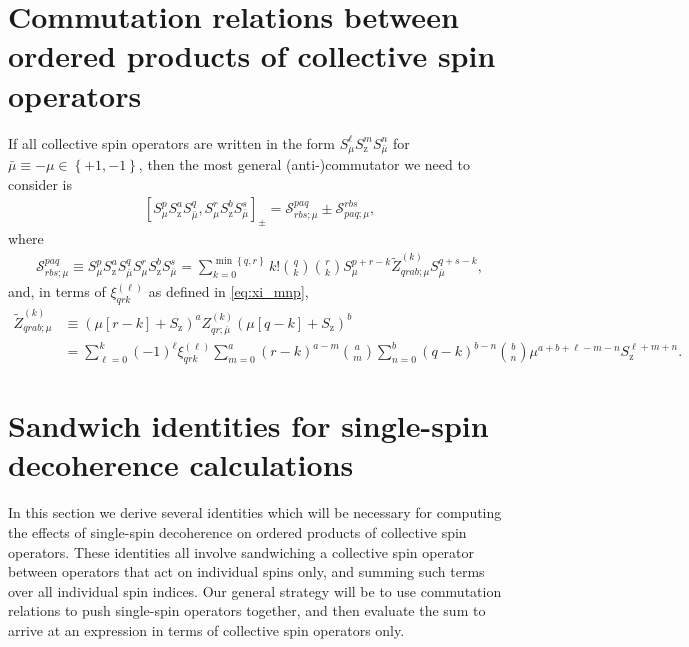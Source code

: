 \documentclass[aps,notitlepage,nofootinbib,11pt]{revtex4-1}
\newcommand{\p}[1]{\left(#1\right)} %
\renewcommand{\sp}[1]{\left[#1\right]} %
\renewcommand{\set}[1]{\left\{#1\right\}} %
\renewcommand{\S}{\mathcal{S}}
\newcommand{\z}{\text{z}}
\newcommand{\bmu}{{\bar\mu}}
\newcommand{\1}{\mathds{1}}
\begin{document}
\section{Commutation relations between ordered products of collective
  spin operators}
\label{sec:comm_general}

If all collective spin operators are written in the form
$S_\mu^\ell S_\z^m S_\bmu^n$ for $\bmu\equiv-\mu\in\set{+1,-1}$, then
the most general (anti-)commutator we need to consider is
\begin{align}
  \sp{S_\mu^p S_\z^a S_\bmu^q, S_\mu^r S_\z^b S_\bmu^s}_\pm
  = \S^{paq}_{rbs;\mu} \pm \S^{rbs}_{paq;\mu},
\end{align}
where
\begin{align}
  \S^{paq}_{rbs;\mu}
  \equiv S_\mu^p S_\z^a S_\bmu^q S_\mu^r S_\z^b S_\bmu^s
  = \sum_{k=0}^{\min\set{q,r}} k! { q \choose k } { r \choose k }
  S_\mu^{p+r-k} \tilde Z_{qrab;\mu}^{(k)} S_\bmu^{q+s-k},
\end{align}
and, in terms of $\xi_{qrk}^{(\ell)}$ as defined in \eqref{eq:xi_mnp},
\begin{align}
  \tilde Z_{qrab;\mu}^{(k)}
  &\equiv \p{\mu\sp{r-k}+S_\z}^a
  Z_{qr;\bmu}^{(k)} \p{\mu\sp{q-k}+S_\z}^b \\
  &= \sum_{\ell=0}^k \p{-1}^\ell \xi_{qrk}^{(\ell)}
  \sum_{m=0}^a \p{r-k}^{a-m} { a \choose m }
  \sum_{n=0}^b \p{q-k}^{b-n} { b \choose n }
  \mu^{a+b+\ell-m-n} S_\z^{\ell+m+n}.
\end{align}


\section{Sandwich identities for single-spin decoherence calculations}
\label{sec:sandwich_single}

In this section we derive several identities which will be necessary
for computing the effects of single-spin decoherence on ordered
products of collective spin operators.  These identities all involve
sandwiching a collective spin operator between operators that act on
individual spins only, and summing such terms over all individual spin
indices.  Our general strategy will be to use commutation relations to
push single-spin operators together, and then evaluate the sum to
arrive at an expression in terms of collective spin operators only.
\end{document}
